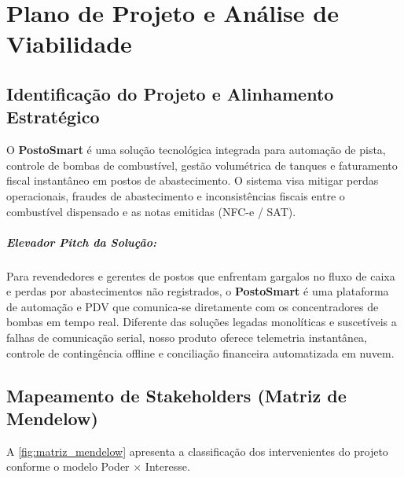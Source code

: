 
\chapter{Plano de Projeto e Análise de Viabilidade}
\label{cap:plano_projeto}

\section{Identificação do Projeto e Alinhamento Estratégico}

O \textbf{PostoSmart} é uma solução tecnológica integrada para automação de pista, controle de bombas de combustível, gestão volumétrica de tanques e faturamento fiscal instantâneo em postos de abastecimento. O sistema visa mitigar perdas operacionais, fraudes de abastecimento e inconsistências fiscais entre o combustível dispensado e as notas emitidas (NFC-e / SAT).

\paragraph{Elevador Pitch da Solução:}
Para revendedores e gerentes de postos que enfrentam gargalos no fluxo de caixa e perdas por abastecimentos não registrados, o \textbf{PostoSmart} é uma plataforma de automação e PDV que comunica-se diretamente com os concentradores de bombas em tempo real. Diferente das soluções legadas monolíticas e suscetíveis a falhas de comunicação serial, nosso produto oferece telemetria instantânea, controle de contingência offline e conciliação financeira automatizada em nuvem.

\section{Mapeamento de Stakeholders (Matriz de Mendelow)}

A \autoref{fig:matriz_mendelow} apresenta a classificação dos intervenientes do projeto conforme o modelo Poder $\times$ Interesse.

